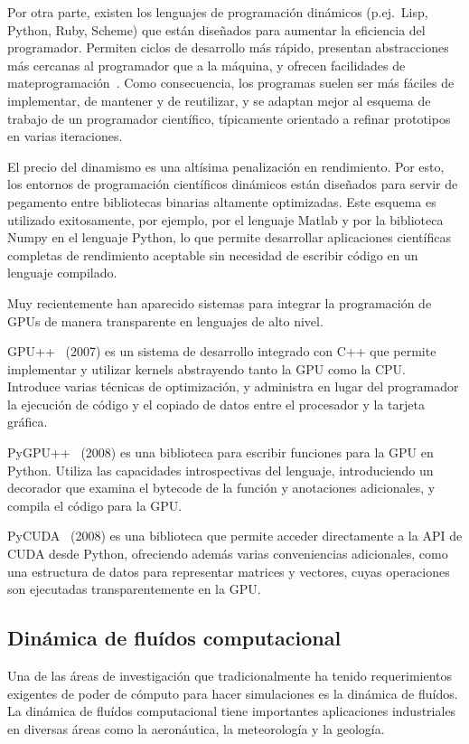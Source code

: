 \documentclass[11pt,spanish]{article}
\begin{document}
Por otra parte, existen los lenguajes de programación dinámicos (p.ej.~Lisp,
Python, Ruby, Scheme) que están diseñados para aumentar la eficiencia
del programador.  Permiten ciclos de desarrollo más rápido, presentan
abstracciones más cercanas al programador que a la máquina, y ofrecen
facilidades de mateprogramación~\cite[\S2]{pygpu}.  Como consecuencia, los
programas suelen ser más fáciles de implementar, de mantener y de reutilizar, y
se adaptan mejor al esquema de trabajo de un programador científico, típicamente
orientado a refinar prototipos en varias iteraciones.

El precio del dinamismo es una altísima penalización en rendimiento.  Por esto,
los entornos de programación científicos dinámicos están diseñados para servir
de pegamento entre bibliotecas binarias altamente optimizadas.  Este esquema es
utilizado exitosamente, por ejemplo, por el lenguaje Matlab y por la biblioteca
Numpy en el lenguaje Python, lo que permite desarrollar aplicaciones científicas
completas de rendimiento aceptable sin necesidad de escribir código en un
lenguaje compilado.

Muy recientemente han aparecido sistemas para integrar la programación de GPUs
de manera transparente en lenguajes de alto nivel.

GPU++~\cite{gpupp} (2007) es un sistema de desarrollo integrado con C++ que
permite implementar y utilizar kernels abstrayendo tanto la GPU como la CPU.
Introduce varias técnicas de optimización, y administra en lugar del programador
la ejecución de código y el copiado de datos entre el procesador y la tarjeta
gráfica.

PyGPU++~\cite{pygpu} (2008) es una biblioteca para escribir funciones para la
GPU en Python. Utiliza las capacidades introspectivas del lenguaje,
introduciendo un decorador que examina el bytecode de la función y anotaciones
adicionales, y compila el código para la GPU.

PyCUDA~\cite{pycuda} (2008) es una biblioteca que permite acceder directamente a
la API de CUDA desde Python, ofreciendo además varias conveniencias adicionales,
como una estructura de datos para representar matrices y vectores, cuyas
operaciones son ejecutadas transparentemente en la GPU.


\subsection{Dinámica de fluídos computacional}
Una de las áreas de investigación que tradicionalmente ha tenido requerimientos
exigentes de poder de cómputo para hacer simulaciones es la dinámica de fluídos.
La dinámica de fluídos computacional tiene importantes aplicaciones industriales
en diversas áreas como la aeronáutica, la meteorología y la geología.
\end{document}
